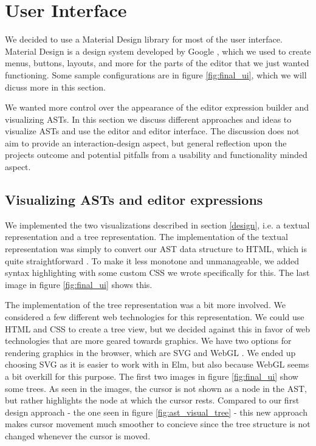 \section{User Interface}
\label{user-interface}

We decided to use a Material Design library \cite{Elm-lang-material-design} for
most of the user interface. Material Design is a design system developed by
Google \cite{Material-design}, which we used to create menus, buttons, layouts,
and more for the parts of the editor that we just wanted functioning. Some
sample configurations are in figure \ref{fig:final_ui}, which we will dicuss
more in this section.

We wanted more control over the appearance of the editor expression builder and
visualizing ASTs. In this section we discuss different approaches and ideas to
visualize ASTs and use the editor and editor interface. The discussion does not
aim to provide an interaction-design aspect, but general reflection upon the
projects outcome and potential pitfalls from a usability and functionality
minded aspect.

\subsection{Visualizing ASTs and editor expressions}

We implemented the two visualizations described in section \ref{design}, i.e. a
textual representation and a tree representation. The implementation of the
textual representation was simply to convert our AST data structure to HTML,
which is quite straightforward \elmhtml. To make it less monotone and
unmanageable, we added syntax highlighting with some custom CSS we wrote
specifically for this. The last image in figure \ref{fig:final_ui} shows this.

The implementation of the tree representation was a bit more involved. We
considered a few different web technologies for this representation. We could
use HTML and CSS to create a tree view, but we decided against this in favor of
web technologies that are more geared towards graphics. We have two options for
rendering graphics in the browser, which are SVG \cite{svg} and WebGL
\cite{webgl}. We ended up choosing SVG as it is easier to work with in Elm, but
also because WebGL seems a bit overkill for this purpose. The first two images
in figure \ref{fig:final_ui} show some trees. As seen in the images, the cursor
is not shown as a node in the AST, but rather highlights the node at which the
cursor rests. Compared to our first design approach - the one seen in figure
\ref{fig:ast_visual_tree} - this new approach makes cursor movement much
smoother to concieve since the tree structure is not changed whenever the cursor
is moved.

